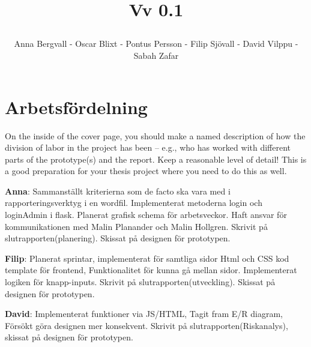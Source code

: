 \documentclass[12pt]{article}
\date {#1}
\title {
    \documentNumber {01}    

    \documentTitle {Helsingborg Event and Convention Bureau}
    
    \documentDate {2021-11-16}
    \documentVersion Vv 0.1
    
    \author{Anna Bergvall - Oscar Blixt - Pontus Persson - Filip Sjövall - David Vilppu - Sabah Zafar }
}
\begin{document}
\maketitle

\thispagestyle{empty}



\newpage

\tableofcontents



\newpage

   
   


\newpage

\section{Arbetsfördelning}
On the inside of the cover page, you should make a named description of how the division of labor in the project has been – e.g., who has worked with different parts of the prototype(s) and the report. Keep a reasonable level of detail! This is a good preparation for your thesis project where you need to do this as well.
    

\textbf{Anna}: Sammanställt kriterierna som de facto ska vara med i rapporteringsverktyg i en wordfil. Implementerat metoderna login och loginAdmin i flask. Planerat grafisk schema för arbetsveckor. Haft ansvar för kommunikationen med Malin Planander och Malin Hollgren. Skrivit på slutrapporten(planering). Skissat på designen för prototypen. 

\textbf{Filip}: Planerat sprintar, implementerat för samtliga sidor Html och CSS kod template för frontend, Funktionalitet för kunna gå mellan sidor. Implementerat logiken för knapp-inputs. Skrivit på slutrapporten(utveckling). Skissat på designen för prototypen. 

\textbf{David}: Implementerat funktioner via JS/HTML, Tagit fram E/R diagram, Försökt göra designen mer konsekvent. Skrivit på slutrapporten(Riskanalys), skissat på designen för prototypen. 
\end{document}
